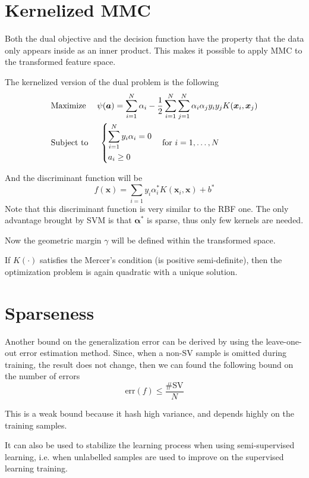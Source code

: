 \documentclass[oneside,onecolumn]{report}
\begin{document}
\section{Kernelized MMC}
Both the dual objective and the decision function have the property that the data only appears inside as an inner product.
This makes it possible to apply MMC to the transformed feature space.

The kernelized version of the dual problem is the following
\begin{align*}
    &\text{Maximize   } \quad \psi(\bm a) = \sum_{i = 1}^N \alpha_i - \frac{1}{2} \sum_{i = 1}^N \sum_{j = 1}^N \alpha_i \alpha_j y_i y_j K(\bm x_i, \bm x_j) \\
    &\text{Subject to } \quad \begin{dcases}
    \sum_{i = 1}^N y_i \alpha_i = 0 \\
    a_i \geq 0
\end{dcases} \quad \text{for } i = 1, \dots, N
\end{align*}

And the discriminant function will be
$$ f(\bm x) = \sum_{i = 1} y_i \alpha_i^* K(\bm x_i, \bm x) + b^* $$
Note that this discriminant function is very similar to the RBF one.
The only advantage brought by SVM is that $\bm \alpha^*$ is sparse, thus only few kernels are needed.

Now the geometric margin $\gamma$ will be defined within the transformed space.

If $K(\cdot)$ satisfies the Mercer's condition (is positive semi-definite), then the optimization problem is again quadratic with a unique solution.

\section{Sparseness}
Another bound on the generalization error can be derived by using the leave-one-out error estimation method.
Since, when a non-SV sample is omitted during training, the result does not change, then we can found the following bound on the number of errors
$$ \text{err}(f) \leq \frac{\#\text{SV}}{N} $$

This is a weak bound because it hash high variance, and depends highly on the training samples.

It can also be used to stabilize the learning process when using semi-supervised learning, i.e. when unlabelled samples are used to improve on the supervised learning training.
\end{document}
